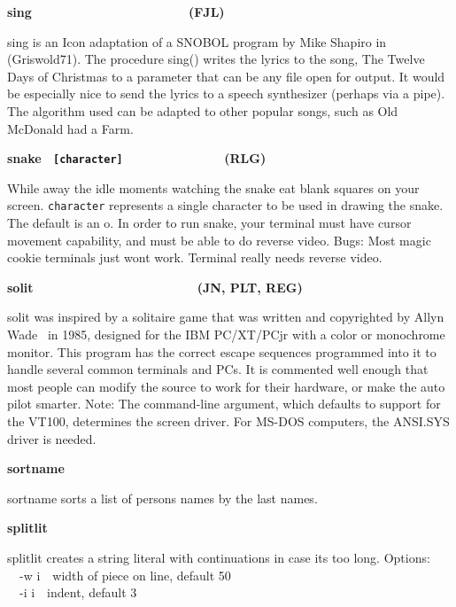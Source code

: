 {{\sffamily\bfseries
sing\ \ \ \ \ \ \ \ \ \ \ \ \ \ \ \ \ \ \ \ \ \  (FJL)}

\textsf{sing} is an Icon adaptation of a SNOBOL program by Mike Shapiro
in (Griswold71). The procedure \textsf{sing()} writes the lyrics to the
song, {\textquotedbl}The Twelve Days of Christmas{\textquotedbl} to a
parameter that can be any file open for output. It would be especially
nice to send the lyrics to a speech synthesizer (perhaps via a pipe).
The algorithm used can be adapted to other popular songs, such as
{\textquotedbl}Old McDonald had a Farm{\textquotedbl}.

{\sffamily\bfseries
snake
\ \texttt{\textmd{[character]\ \ \ \ \ \ \ \ \ \ \ \ \ \ \ \ }}(RLG)}

While away the idle moments watching the snake eat blank squares on your
screen. \texttt{character} represents a single character to be used in
drawing the snake. The default is an
\textsf{{\textquotedbl}o{\textquotedbl}}. In order to run
\textsf{snake}, your terminal must have cursor movement capability, and
must be able to do reverse video. Bugs: Most magic cookie terminals
just won{\textquotesingle}t work. Terminal really needs reverse video.

{\sffamily\bfseries
solit\ \ \ \ \ \ \ \ \ \ \ \ \ \ \ \ \ \  \ \ \ \ \ (JN, PLT, REG)}

\textsf{solit} was inspired by a solitaire game that was written and
copyrighted by Allyn Wade \ in 1985, designed for the IBM PC/XT/PCjr
with a color or monochrome monitor. This program has the correct escape
sequences programmed into it to handle several common terminals and
PC{\textquotesingle}s. It is commented well enough that most people can
modify the source to work for their hardware, or make the auto pilot
smarter. Note: The command-line argument, which defaults to support for
the VT100, determines the screen driver. For MS-DOS computers, the
ANSI.SYS driver is needed.

{\sffamily\bfseries
sortname\ \ \ \ \ \ \ \ \ \ \ \ \ \ \ \ \ \ \ \ }

\textsf{sortname} sorts a list of person{\textquotesingle}s names by the
last names. 

{\sffamily\bfseries
splitlit\ \ \ \ \ \ \ \ \ \ \ \ \ \ \ \ \ \ \ \ \ \ }

\textsf{splitlit} creates a string literal with continuations in case
it{\textquotesingle}s too long. Options:\\
\ \ \textsf{{}-w i}\ \ width of piece on line, default 50\\
\ \ \textsf{{}-i i}\ \  indent, default 3

}
